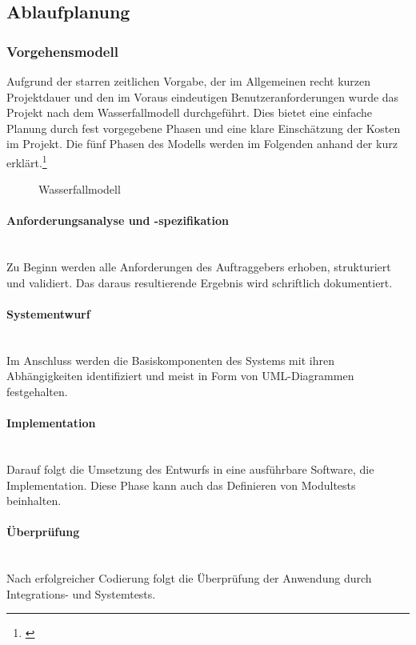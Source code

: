 \subsection{Ablaufplanung}
\label{sec:Ablaufplanung}

\subsubsection{Vorgehensmodell}
\label{sec:Vorgehensmodell}
Aufgrund der starren zeitlichen Vorgabe, der im Allgemeinen recht kurzen Projektdauer und den im Voraus eindeutigen Benutzeranforderungen wurde das Projekt nach dem Wasserfallmodell durchgeführt. Dies bietet eine einfache Planung durch fest vorgegebene Phasen und eine klare Einschätzung der Kosten im Projekt. Die fünf Phasen des Modells werden im Folgenden anhand der  kurz erklärt.\footnote{\cite{wiki:waterfall}} 
\begin{figure}[htb]
	\centering
	\caption{Wasserfallmodell}
	\label{fig:Waterfall}
\end{figure}

\paragraph{Anforderungsanalyse und -spezifikation} ~\\
\label{p:Anforderungsanalyse}
Zu Beginn werden alle Anforderungen des Auftraggebers erhoben, strukturiert und validiert. Das daraus resultierende Ergebnis wird schriftlich dokumentiert.

\paragraph{Systementwurf} ~\\
\label{p:Systementwurf}
Im Anschluss werden die Basiskomponenten des Systems mit ihren Abhängigkeiten identifiziert und meist in Form von UML-Diagrammen festgehalten.

\paragraph{Implementation} ~\\
\label{p:Implementation}
Darauf folgt die Umsetzung des Entwurfs in eine ausführbare Software, die Implementation. Diese Phase kann auch das Definieren von Modultests beinhalten.

\paragraph{Überprüfung} ~\\
\label{p:Ueberpruefung}
Nach erfolgreicher Codierung folgt die Überprüfung der Anwendung durch Integrations- und Systemtests.

